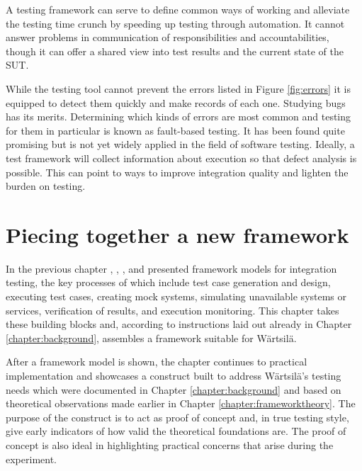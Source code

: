 \documentclass[12pt,a4paper,oneside,pdftex]{report}
\begin{document}
{%

A testing framework can serve to define common ways of working and alleviate the testing time crunch by speeding up testing through automation. It cannot answer problems in communication of responsibilities and accountabilities, though it can offer a shared view into test results and the current state of the SUT.  

While the testing tool cannot prevent the errors listed in Figure \ref{fig:errors} it is equipped to detect them quickly and make records of each one. Studying bugs has its merits. Determining which kinds of errors are most common and testing for them in particular is known as fault-based testing. It has been found quite promising but is not yet widely applied in the field of software testing. \citep{pezze2008software} Ideally, a test framework will collect information about execution so that defect analysis is possible. This can point to ways to improve integration quality and lighten the burden on testing.
  
\chapter{Piecing together a new framework}
\label{chapter:frameworkproposal}

In the previous chapter \citet{fewster1999software}, \citet{huang2008surrogate}, \citet{liu2009unified}, and \citet{laukkanen2006data} presented framework models for integration testing, the key processes of which include test case generation and design, executing test cases, creating mock systems, simulating unavailable systems or services, verification of results, and execution monitoring. This chapter takes these building blocks and, according to instructions laid out already in Chapter \ref{chapter:background}, assembles a framework suitable for Wärtsilä.

After a framework model is shown, the chapter continues to practical implementation and showcases a construct built to address Wärtsilä's testing needs which were documented in Chapter \ref{chapter:background} and based on theoretical observations made earlier in Chapter \ref{chapter:frameworktheory}. The purpose of the construct is to act as proof of concept and, in true testing style, give early indicators of how valid the theoretical foundations are. The proof of concept is also ideal in highlighting practical concerns that arise during the experiment.

}
\end{document}
